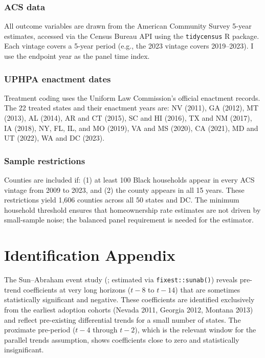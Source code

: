 \documentclass[12pt]{article}
\begin{document}
\subsubsection*{ACS data} All outcome variables are drawn from the American Community Survey 5-year estimates, accessed via the Census Bureau API using the \texttt{tidycensus} R package. Each vintage covers a 5-year period (e.g., the 2023 vintage covers 2019--2023). I use the endpoint year as the panel time index.

\subsubsection*{UPHPA enactment dates} Treatment coding uses the Uniform Law Commission's official enactment records. The 22 treated states and their enactment years are: NV (2011), GA (2012), MT (2013), AL (2014), AR and CT (2015), SC and HI (2016), TX and NM (2017), IA (2018), NY, FL, IL, and MO (2019), VA and MS (2020), CA (2021), MD and UT (2022), WA and DC (2023).

\subsubsection*{Sample restrictions} Counties are included if: (1) at least 100 Black households appear in every ACS vintage from 2009 to 2023, and (2) the county appears in all 15 years. These restrictions yield 1,606 counties across all 50 states and DC. The minimum household threshold ensures that homeownership rate estimates are not driven by small-sample noise; the balanced panel requirement is needed for the \citet{callaway2021} estimator.

\section{Identification Appendix}

The Sun--Abraham event study (\citealt{sunab2021}; estimated via \texttt{fixest::sunab()}) reveals pre-trend coefficients at very long horizons ($t-8$ to $t-14$) that are sometimes statistically significant and negative. These coefficients are identified exclusively from the earliest adoption cohorts (Nevada 2011, Georgia 2012, Montana 2013) and reflect pre-existing differential trends for a small number of states. The proximate pre-period ($t-4$ through $t-2$), which is the relevant window for the parallel trends assumption, shows coefficients close to zero and statistically insignificant.
\end{document}
